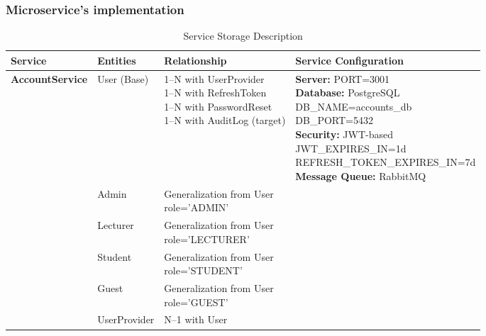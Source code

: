 \subsubsection{Microservice's implementation}

\begin{table}[H]
\centering
\caption{Service Storage Description}
\label{tab:service-storage}
\scriptsize
\renewcommand{\arraystretch}{1.3}

\begin{tabularx}{\textwidth}{|l|X|X|X|}
\hline
\textbf{Service} & \textbf{Entities} & \textbf{Relationship} & \textbf{Service Configuration} \\
\hline

\multirow{7}{*}{\textbf{AccountService}} 
& User (Base) 
& \makecell[l]{1--N with UserProvider \\ 1--N with RefreshToken \\ 1--N with PasswordReset \\ 1--N with AuditLog (target)} 
& \makecell[l]{
\textbf{Server:} PORT=3001 \\ 
\textbf{Database:} PostgreSQL \\ 
DB\_NAME=accounts\_db \\ 
DB\_PORT=5432 \\
\textbf{Security:} JWT-based \\ 
JWT\_EXPIRES\_IN=1d \\ 
REFRESH\_TOKEN\_EXPIRES\_IN=7d \\
\textbf{Message Queue:} RabbitMQ
} \\
\cline{2-3}

& Admin 
& \makecell[l]{Generalization from User \\ role='ADMIN'} 
& \multirow{6}{*}{} \\
\cline{2-3}

& Lecturer 
& \makecell[l]{Generalization from User \\ role='LECTURER'} 
& \\
\cline{2-3}

& Student 
& \makecell[l]{Generalization from User \\ role='STUDENT'} 
& \\
\cline{2-3}

& Guest 
& \makecell[l]{Generalization from User \\ role='GUEST'} 
& \\
\cline{2-3}

& UserProvider 
& N--1 with User 
& \\
\cline{2-3}


\end{tabularx}
\end{table}
